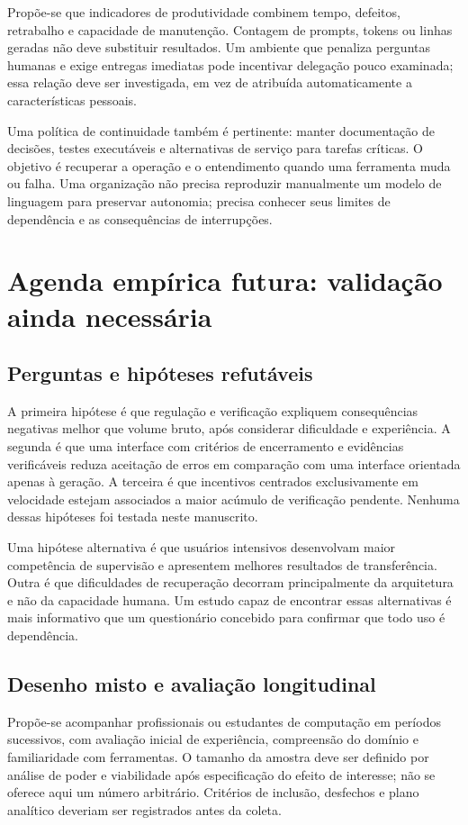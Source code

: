 \documentclass[11pt,a4paper]{article}
\begin{document}
Propõe-se que indicadores de produtividade combinem tempo, defeitos, retrabalho e capacidade de manutenção. Contagem de prompts, tokens ou linhas geradas não deve substituir resultados. Um ambiente que penaliza perguntas humanas e exige entregas imediatas pode incentivar delegação pouco examinada; essa relação deve ser investigada, em vez de atribuída automaticamente a características pessoais.

Uma política de continuidade também é pertinente: manter documentação de decisões, testes executáveis e alternativas de serviço para tarefas críticas. O objetivo é recuperar a operação e o entendimento quando uma ferramenta muda ou falha. Uma organização não precisa reproduzir manualmente um modelo de linguagem para preservar autonomia; precisa conhecer seus limites de dependência e as consequências de interrupções.

\section{Agenda empírica futura: validação ainda necessária}
\subsection{Perguntas e hipóteses refutáveis}
A primeira hipótese é que regulação e verificação expliquem consequências negativas melhor que volume bruto, após considerar dificuldade e experiência. A segunda é que uma interface com critérios de encerramento e evidências verificáveis reduza aceitação de erros em comparação com uma interface orientada apenas à geração. A terceira é que incentivos centrados exclusivamente em velocidade estejam associados a maior acúmulo de verificação pendente. Nenhuma dessas hipóteses foi testada neste manuscrito.

Uma hipótese alternativa é que usuários intensivos desenvolvam maior competência de supervisão e apresentem melhores resultados de transferência. Outra é que dificuldades de recuperação decorram principalmente da arquitetura e não da capacidade humana. Um estudo capaz de encontrar essas alternativas é mais informativo que um questionário concebido para confirmar que todo uso é dependência.

\subsection{Desenho misto e avaliação longitudinal}
Propõe-se acompanhar profissionais ou estudantes de computação em períodos sucessivos, com avaliação inicial de experiência, compreensão do domínio e familiaridade com ferramentas. O tamanho da amostra deve ser definido por análise de poder e viabilidade após especificação do efeito de interesse; não se oferece aqui um número arbitrário. Critérios de inclusão, desfechos e plano analítico deveriam ser registrados antes da coleta.
\end{document}
